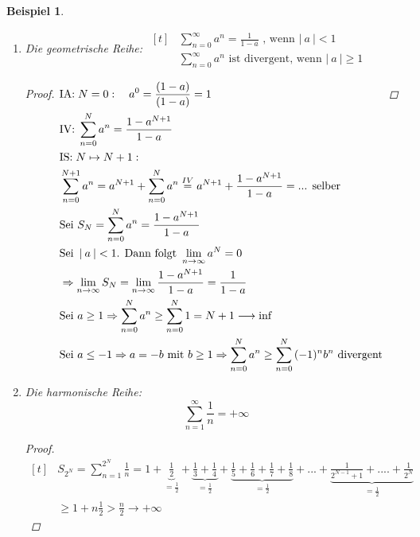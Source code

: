 \documentclass[a4paper,titlepage,oneside]{article}
\newcommand{\IA}[1][n=0]{\vspace{0.1pt}\ensuremath{\text{IA:}\sp#1:}}
\newcommand{\IV}{\vspace{0.1pt}\ensuremath{\text{IV:}\sp}}
\newcommand{\IS}[1][n \mapsto n+1]{\vspace{0.1pt}\ensuremath{\text{IS:}\sp#1:}}
\def\sp{\hspace{0,1cm}}
\newcommand{\suminf}[2][n]{\ensuremath{\sum_{#1= 0}^{\infty}{#2}}}
\renewcommand{\liminf}[2][n]{\ensuremath{\lim\limits_{#1 \rightarrow \infty}{#2}}}
\newcommand{\abs}[1]{\ensuremath{\left|\:#1\:\right|}}
\theoremstyle{thmstyle}
\newtheorem{bsp}[satz]{Beispiel}
\theoremstyle{subthmstyle}
\begin{document}
\begin{bsp}\
\begin{enumerate}
\item Die geometrische Reihe:
\begin{math}\displaystyle \begin{aligned}[t]
&\suminf{a^n} = \frac{1}{1-a} \text{ , wenn } \abs{a} < 1 \\
&\suminf{a^n} \text{ ist divergent, wenn } \abs{a} \ge 1
\end{aligned}\end{math} 

\begin{proof}
\begin{math}\displaystyle \begin{aligned}[t]
&\IA[N=0] \quad a^0 = \frac{(1-a)}{(1- a)} = 1 \\
&\IV \sum_{n = 0}^{N}{a^n} = \frac{1-a^{N+1}}{1-a} \\
&\IS[N \mapsto N+1] \\
&\sum_{n = 0}^{N+1}{a^n} = a^{N+1} + \sum_{n = 0}^{N}{a^n} \overset{IV}{=} a^{N+1} + \frac{1-a^{N+1}}{1-a} = \text{... selber} \\ %
&\text{Sei }S_N = \sum_{n=0}^{N}{a^n} = \frac{1 - a^{N+1}}{1- a} \\
&\text{Sei }\abs{a} < 1\text{. Dann folgt }\liminf{a^N} = 0 \\
&\Rightarrow \liminf{S_N} = \liminf{\frac{1-a^{N+1}}{1-a}} = \frac{1}{1-a} \\
&\text{Sei }a \ge 1 \Rightarrow \sum_{n=0}^{N}{a^n} \ge \sum_{n=0}^{N}{1} = N+1 \longrightarrow \inf \\
&\text{Sei }a \le -1 \Rightarrow a = -b \text{ mit }b \ge 1 \Rightarrow \sum_{n=0}^{N}{a^n} \ge \sum_{n=0}^{N}{(-1)^nb^n} \text{ divergent}
\end{aligned}\end{math} 
\end{proof}

\item Die harmonische Reihe:
\[\sum_{n=1}^{\infty}{\frac{1}{n}} = +\infty\]

\begin{proof}
\begin{math}\displaystyle \begin{aligned}[t]
&S_{2^N} = \sum_{n = 1}^{2^N}{\frac{1}{n}} =
1 +\underbrace{\frac{1}{2}}_{=\frac{1}{2}} + \underbrace{\frac{1}{3} + \frac{1}{4}}_{=\frac{1}{2}} + \underbrace{\frac{1}{5} + \frac{1}{6} + \frac{1}{7} + \frac{1}{8}}_{=\frac{1}{2}} +  ... + \underbrace{\frac{1}{2^{N-1}+1}+ .... + \frac{1}{2^N}}_{=\frac{1}{2}} \\
&\ge 1 + n \frac{1}{2} > \frac{n}{2} \longrightarrow +\infty
\end{aligned}\end{math} 


\end{proof}
\end{enumerate}
\end{bsp}
\end{document}
